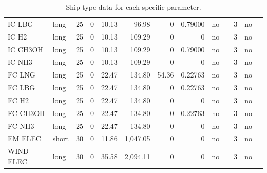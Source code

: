 \documentclass[article]{elsarticle}
\begin{document}
\begin{table}[htb]
{\begin{tabular}{llrrrrrrrrrrr}
        IC LBG         & long  & 25     & 0      & 10.13       & 96.98    & 0                & 0.79000          & no    &                & 3           & no     & \cite{UNCTAD2017,Bengtsson2012} \\
        IC H2          & long  & 25     & 0      & 10.13       & 109.29   & 0                & 0                & no    &                & 3           & no     & \cite{UNCTAD2017,ElGohary2013} \\
        IC CH3OH       & long  & 25     & 0      & 10.13       & 109.29   & 0                & 0.79000          & no    &                & 3           & no     & \cite{UNCTAD2017,Andersson2015,BRYNOLF2014} \\
        IC NH3         & long  & 25     & 0      & 10.13       & 109.29   & 0                & 0                & no    &                & 3           & no     & \cite{UNCTAD2017} \\
        FC LNG         & long  & 25     & 0      & 22.47       & 134.80   & 54.36            & 0.22763          & no    &                & 3           & no     & \cite{UNCTAD2017,VanBiert2016} \\
        FC LBG         & long  & 25     & 0      & 22.47       & 134.80   & 0                & 0.22763          & no    &                & 3           & no     & \cite{UNCTAD2017,VanBiert2016} \\
        FC H2          & long  & 25     & 0      & 22.47       & 134.80   & 0                & 0                & no    &                & 3           & no     & \cite{UNCTAD2017,USDE2015} \\
        FC CH3OH       & long  & 25     & 0      & 22.47       & 134.80   & 0                & 0.22763          & no    &                & 3           & no     & \cite{UNCTAD2017,VanBiert2016} \\
        FC NH3         & long  & 25     & 0      & 22.47       & 134.80   & 0                & 0                & no    &                & 3           & no     & \cite{UNCTAD2017} \\
        EM ELEC        & short & 30     & 0      & 11.86       & 1,047.05 & 0                & 0                & no    &                & 3           & no     & \cite{DNVGL2015} \\
        WIND ELEC      & long  & 30     & 0      & 35.58       & 2,094.11 & 0                & 0                & no    &                & 3           & no     &  \\  
    \bottomrule
    \end{tabular}}
    \caption[Ship type data]{Ship type data for each specific parameter.}
    \label{tab:ship_data}
\end{table}
\end{document}
